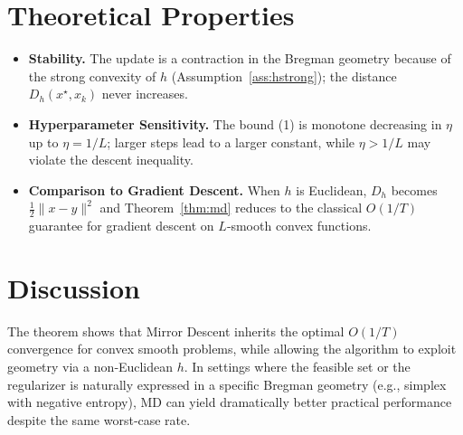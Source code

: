 \documentclass[11pt]{article}
\newcommand{\D}{D}
\begin{document}
\section*{Theoretical Properties}
\begin{itemize}
\item \textbf{Stability.} The update is a contraction in the Bregman geometry because of the strong convexity of $h$ (Assumption~\ref{ass:hstrong}); the distance $\D_h(x^{\star},x_k)$ never increases.
\item \textbf{Hyperparameter Sensitivity.} The bound (1) is monotone decreasing in $\eta$ up to $\eta=1/L$; larger steps lead to a larger constant, while $\eta>1/L$ may violate the descent inequality.
\item \textbf{Comparison to Gradient Descent.} When $h$ is Euclidean, $\D_h$ becomes $\frac12\|x-y\|^2$ and Theorem~\ref{thm:md} reduces to the classical $O(1/T)$ guarantee for gradient descent on $L$‑smooth convex functions.
\end{itemize}

\section*{Discussion}
The theorem shows that Mirror Descent inherits the optimal $O(1/T)$ convergence for convex smooth problems, while allowing the algorithm to exploit geometry via a non‑Euclidean $h$. In settings where the feasible set or the regularizer is naturally expressed in a specific Bregman geometry (e.g., simplex with negative entropy), MD can yield dramatically better practical performance despite the same worst‑case rate.

\newpage
\end{document}
